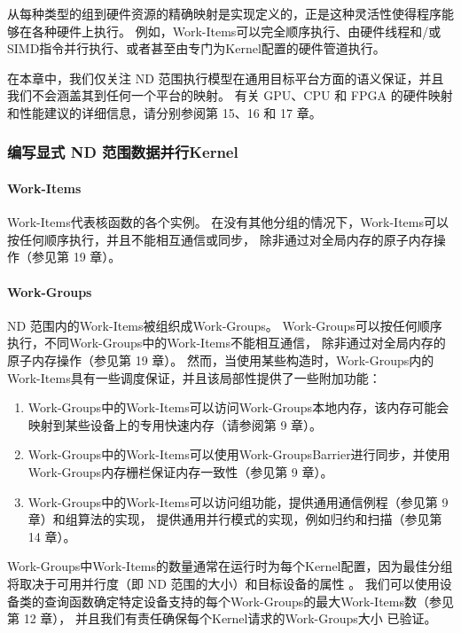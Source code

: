 从每种类型的组到硬件资源的精确映射是实现定义的，正是这种灵活性使得程序能够在各种硬件上执行。 
例如，Work-Items可以完全顺序执行、由硬件线程和/或SIMD指令并行执行、或者甚至由专门为Kernel配置的硬件管道执行。

在本章中，我们仅关注 ND 范围执行模型在通用目标平台方面的语义保证，并且我们不会涵盖其到任何一个平台的映射。 
有关 GPU、CPU 和 FPGA 的硬件映射和性能建议的详细信息，请分别参阅第 15、16 和 17 章。

\subsubsection{编写显式 ND 范围数据并行Kernel}
\paragraph{Work-Items}

Work-Items代表核函数的各个实例。 
在没有其他分组的情况下，Work-Items可以按任何顺序执行，并且不能相互通信或同步，
除非通过对全局内存的原子内存操作（参见第 19 章）。

\paragraph{Work-Groups}

ND 范围内的Work-Items被组织成Work-Groups。 Work-Groups可以按任何顺序执行，不同Work-Groups中的Work-Items不能相互通信，
除非通过对全局内存的原子内存操作（参见第 19 章）。 
然而，当使用某些构造时，Work-Groups内的Work-Items具有一些调度保证，并且该局部性提供了一些附加功能：

\begin{enumerate}
	\item Work-Groups中的Work-Items可以访问Work-Groups本地内存，该内存可能会映射到某些设备上的专用快速内存（请参阅第 9 章）。

	\item Work-Groups中的Work-Items可以使用Work-GroupsBarrier进行同步，并使用Work-Groups内存栅栏保证内存一致性（参见第 9 章）。

	\item Work-Groups中的Work-Items可以访问组功能，提供通用通信例程（参见第 9 章）和组算法的实现，
	提供通用并行模式的实现，例如归约和扫描（参见第 14 章）。
\end{enumerate}

Work-Groups中Work-Items的数量通常在运行时为每个Kernel配置，因为最佳分组将取决于可用并行度（即 ND 范围的大小）和目标设备的属性 。 
我们可以使用设备类的查询函数确定特定设备支持的每个Work-Groups的最大Work-Items数（参见第 12 章），
并且我们有责任确保每个Kernel请求的Work-Groups大小 已验证。

